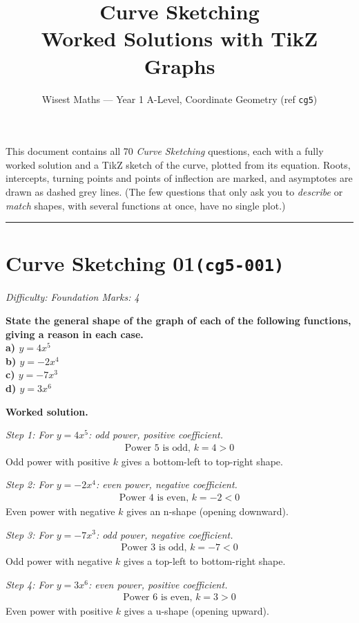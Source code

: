 \documentclass[11pt]{article}
\title{\textbf{Curve Sketching}\\[0.3em]\large Worked Solutions with TikZ Graphs}
\author{Wisest Maths --- Year 1 A-Level, Coordinate Geometry (ref \texttt{cg5})}
\date{}
\newcommand{\question}[1]{\par\medskip\noindent\textbf{#1}\par}
\begin{document}
\maketitle
\noindent This document contains all 70 \emph{Curve Sketching} questions, each with a fully worked
solution and a TikZ sketch of the curve, plotted from its equation. Roots, intercepts, turning points and
points of inflection are marked, and asymptotes are drawn as dashed grey lines. (The few questions that
only ask you to \emph{describe} or \emph{match} shapes, with several functions at once, have no single plot.)
\tableofcontents
\bigskip
\hrule

\section*{Curve Sketching 01\quad\small\texttt{(cg5-001)}}
\textit{Difficulty: Foundation \quad\textbar\quad Marks: 4}

\question{State the general shape of the graph of each of the following functions, giving a reason in each case. \\[3pt] a) \( y = 4x^5 \) \\[3pt] b) \( y = -2x^4 \) \\[3pt] c) \( y = -7x^3 \) \\[3pt] d) \( y = 3x^6 \)}

\textbf{Worked solution.}

\textit{Step 1: For \( y = 4x^5 \): odd power, positive coefficient.}
\[\begin{gathered}
\text{Power } 5 \text{ is odd, } k = 4 > 0
\end{gathered}\]
Odd power with positive \( k \) gives a bottom-left to top-right shape.

\textit{Step 2: For \( y = -2x^4 \): even power, negative coefficient.}
\[\begin{gathered}
\text{Power } 4 \text{ is even, } k = -2 < 0
\end{gathered}\]
Even power with negative \( k \) gives an n-shape (opening downward).

\textit{Step 3: For \( y = -7x^3 \): odd power, negative coefficient.}
\[\begin{gathered}
\text{Power } 3 \text{ is odd, } k = -7 < 0
\end{gathered}\]
Odd power with negative \( k \) gives a top-left to bottom-right shape.

\textit{Step 4: For \( y = 3x^6 \): even power, positive coefficient.}
\[\begin{gathered}
\text{Power } 6 \text{ is even, } k = 3 > 0
\end{gathered}\]
Even power with positive \( k \) gives a u-shape (opening upward).
\end{document}
